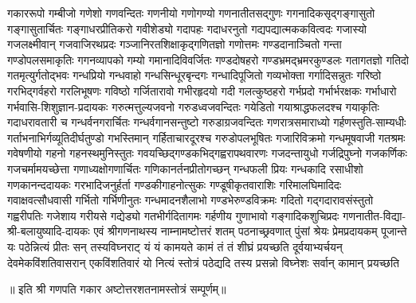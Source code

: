 
\twolineshloka
{गकाररूपो गम्बीजो गणेशो गणवन्दितः}
{गणनीयो गणोगण्यो गणनातीतसद्गुणः}%
\twolineshloka
{गगनादिकसृद्गङ्गासुतो गङ्गासुतार्चितः}
{गङ्गाधरप्रीतिकरो गवीशेड्यो गदापहः}%
\twolineshloka
{गदाधरनुतो गद्यपद्यात्मककवित्वदः}
{गजास्यो गजलक्ष्मीवान् गजवाजिरथप्रदः}%
\twolineshloka
{गञ्जानिरतशिक्षाकृद्गणितज्ञो गणोत्तमः}
{गण्डदानाञ्चितो गन्ता गण्डोपलसमाकृतिः}%
\twolineshloka
{गगनव्यापको गम्यो गमानादिविवर्जितः}
{गण्डदोषहरो गण्डभ्रमद्भ्रमरकुण्डलः}%
\twolineshloka
{गतागतज्ञो गतिदो गतमृत्युर्गतोद्भवः}
{गन्धप्रियो गन्धवाहो गन्धसिन्धूरबृन्दगः}%
\twolineshloka
{गन्धादिपूजितो गव्यभोक्ता गर्गादिसन्नुतः}
{गरिष्ठो गरभिद्गर्वहरो गरलिभूषणः}%
\twolineshloka
{गविष्ठो गर्जितारावो गभीरहृदयो गदी}
{गलत्कुष्ठहरो गर्भप्रदो गर्भार्भरक्षकः}%
\twolineshloka
{गर्भाधारो गर्भवासि-शिशुज्ञान-प्रदायकः}
{गरुत्मत्तुल्यजवनो गरुडध्वजवन्दितः}%
\twolineshloka
{गयेडितो गयाश्राद्धफलदश्च गयाकृतिः}
{गदाधरावतारी च गन्धर्वनगरार्चितः}%
\twolineshloka
{गन्धर्वगानसन्तुष्टो गरुडाग्रजवन्दितः}
{गणरात्रसमाराध्यो गर्हणस्तुति-साम्यधीः}%
\twolineshloka
{गर्ताभनाभिर्गव्यूतिदीर्घतुण्डो गभस्तिमान्}
{गर्हिताचारदूरश्च गरुडोपलभूषितः}%
\twolineshloka
{गजारिविक्रमो गन्धमूषवाजी गतश्रमः}
{गवेषणीयो गहनो गहनस्थमुनिस्तुतः}%
\twolineshloka
{गवयच्छिद्गण्डकभिद्गह्वरापथवारणः}
{गजदन्तायुधो गर्जद्रिपुघ्नो गजकर्णिकः}%
\twolineshloka
{गजचर्मामयच्छेत्ता गणाध्यक्षोगणार्चितः}%
{गणिकानर्तनप्रीतोगच्छन् गन्धफली प्रियः}%
\twolineshloka
{गन्धकादि रसाधीशो गणकानन्ददायकः}%
{गरभादिजनुर्हर्ता गण्डकीगाहनोत्सुकः}%
\twolineshloka
{गण्डूषीकृतवाराशिः गरिमालघिमादिदः}%
{गवाक्षवत्सौधवासी गर्भितो गर्भिणीनुतः}%
\twolineshloka
{गन्धमादनशैलाभो गण्डभेरुण्डविक्रमः}%
{गदितो गद्गदारावसंस्तुतो गह्वरीपतिः}%
\twolineshloka
{गजेशाय गरीयसे गद्येड्यो गतभीर्गदितागमः}%
{गर्हणीय गुणाभावो गङ्गादिकशुचिप्रदः}%
\twolineshloka
{गणनातीत-विद्या-श्री-बलायुष्यादि-दायकः}%
{एवं श्रीगणनाथस्य नाम्नामष्टोत्तरं शतम्}%
\twolineshloka
{पठनाच्छ्रवणात् पुंसां श्रेयः प्रेमप्रदायकम्}%
{पूजान्ते यः पठेन्नित्यं प्रीतः सन् तस्यविघ्नराट्}%
\twolineshloka
{यं यं कामयते कामं तं तं शीघ्रं प्रयच्छति}%
{दूर्वयाभ्यर्चयन् देवमेकविंशतिवासरान्}%
\twolineshloka
{एकविंशतिवारं यो नित्यं स्तोत्रं पठेद्यदि}%
{तस्य प्रसन्नो विघ्नेशः सर्वान् कामान् प्रयच्छति}%

॥ इति श्री गणपति गकार अष्टोत्तरशतनामस्तोत्रं सम्पूर्णम्॥
